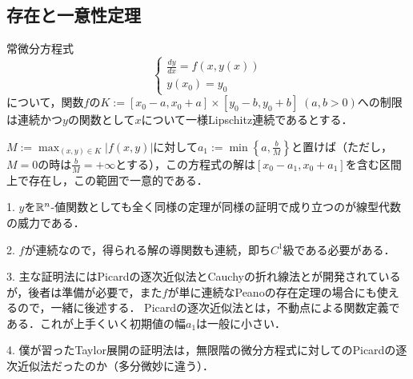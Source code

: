 \documentclass[uplatex,dvipdfmx]{jsreport}
\begin{document}
\subsection{存在と一意性定理}
\begin{shadebox}\begin{theorem}\label{thm-Cauchy-existence-uniqueness}
    常微分方程式
    \[\begin{cases}
        \frac{dy}{dx}=f(x,y(x))\\
        y(x_0)=y_0
    \end{cases}\]
    について，関数$f$の$K:=[x_0-a,x_0+a]\times[y_0-b,y_0+b]\;(a,b>0)$への制限は連続かつ$y$の関数として$x$について一様Lipschitz連続であるとする．

    $M:=\max_{(x,y)\in K}|f(x,y)|$に対して$a_1:=\min\left\{a,\frac{b}{M}\right\}$と置けば（ただし，$M=0$の時は$\frac{b}{M}=+\infty$とする），この方程式の解は$[x_0-a_1,x_0+a_1]$を含む区間上で存在し，この範囲で一意的である．
\end{theorem}\end{shadebox}
\begin{remark}
    1. $y$を$\mathbb{R}^n$-値関数としても全く同様の定理が同様の証明で成り立つのが線型代数の威力である．

    2. $f$が連続なので，得られる解の導関数も連続，即ち$C^1$級である必要がある．

    3. 主な証明法にはPicardの逐次近似法とCauchyの折れ線法とが開発されているが，後者は準備が必要で，また$f$が単に連続なPeanoの存在定理の場合にも使えるので，一緒に後述する．
    Picardの逐次近似法とは，不動点による関数定義である．これが上手くいく初期値の幅$a_1$は一般に小さい．

    4. 僕が習ったTaylor展開の証明法は，無限階の微分方程式に対してのPicardの逐次近似法だったのか（多分微妙に違う）．
\end{remark}
\end{document}
